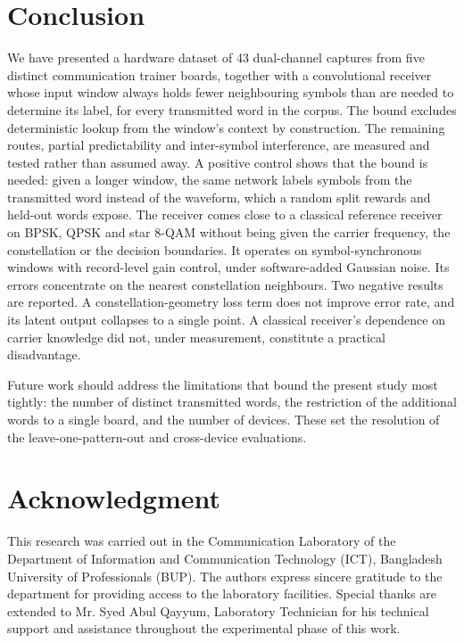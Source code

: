 \documentclass{ieeeaccess}
\newif\ifdraft
\newcommand{\todonote}[2]{%
  \ifdraft
    \par\medskip\noindent
    \fbox{\parbox{0.94\columnwidth}{\footnotesize
      \textbf{[TO WRITE --- #1]}\\[2pt]#2}}%
    \par\medskip
  \fi}
\begin{document}
\section{Conclusion}
We have presented a hardware dataset of 43 dual-channel captures from five
distinct communication trainer boards, together with a convolutional receiver
whose input window always holds fewer neighbouring symbols than are needed to
determine its label, for every transmitted word in the corpus. The bound
excludes deterministic lookup from the window's context by construction. The
remaining routes, partial predictability and inter-symbol interference, are
measured and tested rather than assumed away. A positive control shows that
the bound is needed: given a longer window, the same network labels symbols
from the transmitted word instead of the waveform, which a random split rewards
and held-out words expose. The receiver comes close to a
classical reference receiver on BPSK, QPSK and star 8-QAM without being given
the carrier frequency, the constellation or the decision boundaries. It
operates on symbol-synchronous windows with record-level gain control, under
software-added Gaussian noise. Its errors concentrate on the nearest
constellation neighbours. Two negative results are reported. A
constellation-geometry loss term does not improve error rate, and its latent
output collapses to a single point. A classical receiver's dependence on
carrier knowledge did not, under measurement, constitute a practical
disadvantage.

Future work should address the limitations that bound the present study
most tightly: the number of distinct transmitted words, the restriction of the
additional words to a single board, and the number of devices. These set the
resolution of the leave-one-pattern-out and cross-device evaluations.

\section*{Acknowledgment}
This research was carried out in the Communication Laboratory of the Department of Information and Communication Technology (ICT), Bangladesh University of Professionals (BUP). The authors express sincere gratitude to the department for providing access to the laboratory facilities. Special thanks are extended to Mr. Syed Abul Qayyum, Laboratory Technician  for his technical support and assistance throughout the experimental phase of this work.
\end{document}

